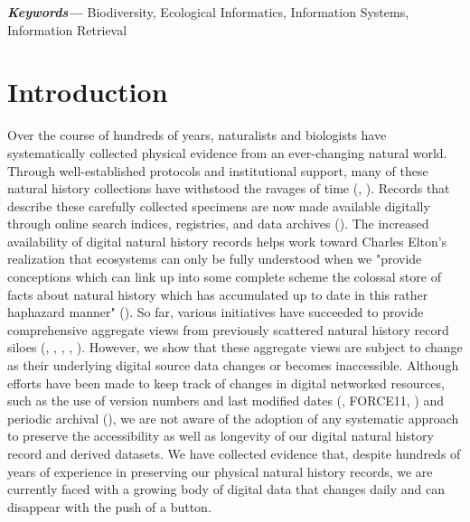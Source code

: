 \documentclass[12pt,letterpaper]{article}
\providecommand{\keywords}[1]{\textbf{\textit{Keywords---}} #1}
\begin{document}
\keywords{Biodiversity, Ecological Informatics, Information Systems, Information Retrieval}

\section*{Introduction}
Over the course of hundreds of years, naturalists and biologists have systematically collected physical evidence from an ever-changing natural world. Through well-established protocols and institutional support, many of these natural history collections have withstood the ravages of time (\cite{Hortal_2015}, \cite{Davis_1996}). Records that describe these carefully collected specimens are now made available digitally through online search indices, registries, and data archives (\cite{Page_2015}). The increased availability of digital natural history records helps work toward Charles Elton’s realization that ecosystems can only be fully understood when we "provide conceptions which can link up into some complete scheme the colossal store of facts about natural history which has accumulated up to date in this rather haphazard manner" (\cite{Elton_1927}). So far, various initiatives have succeeded to provide comprehensive aggregate views from previously scattered natural history record siloes (\cite{Rinaldo_2009}, \cite{Michener_2011}, \cite{Edwards_2000}, \cite{matsunaga2013integrated}, \cite{gbif_org_2019}). However, we show that these aggregate views are subject to change as their underlying digital source data changes or becomes inaccessible. Although efforts have been made to keep track of changes in digital networked resources, such as the use of version numbers and last modified dates (\cite{Wieczorek_2012}, FORCE11, \cite{Robertson_2014}) and periodic archival (\cite{Costello_2013}),  we are not aware of the adoption of any systematic approach to preserve the accessibility as well as longevity of our digital natural history record and derived datasets. We have collected evidence that, despite hundreds of years of experience in preserving our physical natural history records, we are currently faced with a growing body of digital data that changes daily and can disappear with the push of a button.
\end{document}

